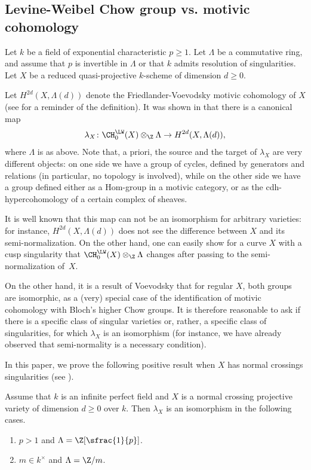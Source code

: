 \subsection{Levine-Weibel Chow group vs. motivic cohomology}
\label{sec:LWMC**}
Let $k$ be a field of exponential characteristic $p \ge 1$. Let $\Lambda$ be a commutative ring, and assume that $p$ is invertible in $\Lambda$ or that $k$ admits resolution of singularities.
Let $X$ be a reduced quasi-projective $k$-scheme of dimension $d \ge 0$.

Let $H^{2d}(X, \Lambda(d))$ denote the Friedlander-Voevodsky motivic cohomology
of $X$ (see  for a reminder of the definition).
It was shown in \cite{KP} that there is a canonical
map
\begin{equation}\label{eqn:LW-FS}
\lambda_X \colon \CH^{\LW}_0(X) \otimes_{\Z} \Lambda \to H^{2d}(X, \Lambda(d)),
\end{equation}
where $\Lambda$ is as above. Note that, a priori, the source and the target of $\lambda_X$ are very different objects: on one side we have a group of cycles, defined by generators and relations (in particular, no topology is involved), while on the other side we have a group defined either as a Hom-group in a motivic category, or as the cdh-hypercohomology of a certain complex of sheaves.

It is well known that this map can not be an isomorphism for arbitrary
varieties: for instance, $H^{2d}(X, \Lambda(d))$ does not
see the difference between $X$ and its semi-normalization. On the other
hand, one can easily show for a curve $X$ with a cusp singularity
that $\CH^{\LW}_0(X) \otimes_{\Z}\Lambda$ changes after passing to
the semi-normalization of~$X$.

On the other hand, it is a result of Voevodsky that for regular $X$, both groups are isomorphic, as a (very) special case of the identification of motivic cohomology with Bloch's higher Chow groups. It is therefore reasonable to ask if there is a specific class of singular varieties or, rather, a specific class of singularities, for which $\lambda_X$ is an isomorphism (for instance, we have already observed that semi-normality is a necessary condition).

In this paper, we prove the following positive result when
$X$ has normal crossings
singularities (see ).

\begin{thm}\label{thm:Main-6}
Assume that $k$ is an infinite perfect field
and $X$ is a normal crossing projective
variety of dimension $d \ge 0$ over $k$.
Then $\lambda_X$ is an isomorphism in the following cases.
\begin{enumerate}
\item
$p > 1$ and $\Lambda = \Z[\sfrac{1}{p}]$.
\item
$m \in k^{\times}$ and $\Lambda = {\Z}/m$.
\end{enumerate}
\end{thm}

